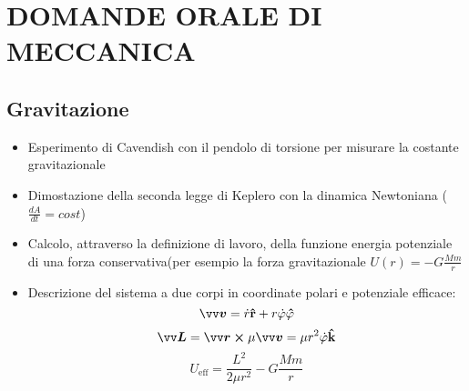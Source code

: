 \section*{DOMANDE ORALE DI MECCANICA}

\subsection*{Gravitazione}
\begin{itemize}

    \item Esperimento di Cavendish con il pendolo di torsione per misurare la costante gravitazionale
    \item Dimostazione della seconda legge di Keplero con la dinamica Newtoniana ($\frac{dA}{dt}= cost$)
    \item Calcolo, attraverso la definizione di lavoro, della funzione energia potenziale di una forza 
    conservativa(per esempio la forza gravitazionale $U(r) = -G\frac{Mm}{r}$
    \item Descrizione del sistema a due corpi in coordinate polari e potenziale efficace: 
    \[
    \vec{v} = \dot{r} \v{r} + r \dot{\varphi} \v{\varphi}    
    \]
    \[
    \vec{L} = \vec{r} \cross \mu \vec{v} = \mu r^2 \dot{\varphi} \v{k}  
    \]
    \[
    U_{\text{eff}} = \frac{L^2}{2 \mu r^2} - G \frac{Mm}{r}    
    \]

\end{itemize}
